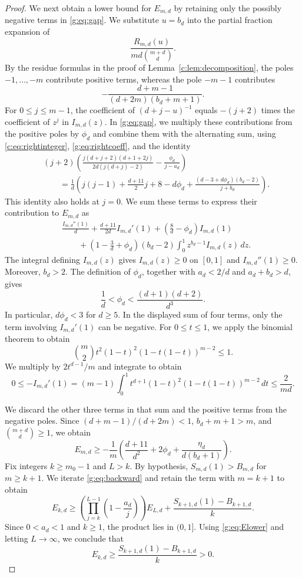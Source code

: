 \documentclass[11pt]{article}
\numberwithin{equation}{section}
\theoremstyle{remark}\newtheorem{remark}[theorem]{Remark}
\begin{document}
\begin{proof}
We next obtain a lower bound for $E_{m,d}$ by retaining only
the possibly negative terms in \eqref{g:eq:gap}.
We substitute $u=b_d$ into the partial fraction expansion of
\[
 \frac{R_{m,d}(u)}{md\binom{m+d}{d}}.
\]
By the residue formulas in the proof of
Lemma~\ref{c:lem:decomposition}, the poles $-1,\ldots,-m$ contribute
positive terms, whereas the pole $-m-1$ contributes
\[
 -\frac{d+m-1}{(d+2m)(b_d+m+1)}.
\]
For $0\le j\le m-1$, the coefficient of $(d+j-u)^{-1}$ equals
$-(j+2)$ times the coefficient of $z^j$ in $I_{m,d}(z)$.
In \eqref{g:eq:gap}, we multiply these contributions from the positive poles by
$\phi_d$ and combine them with the alternating sum, using \eqref{c:eq:rightinteger},
\eqref{g:eq:rightcoeff}, and the identity
\[
\begin{aligned}
 &(j+2)\left(
 \frac{j(d+j+2)(d+1+2j)}{2d(j(d+j)-2)}
 -\frac{\phi_d}{j-a_d}\right)\\
 &\qquad=\frac1d\left(j(j-1)+\frac{d+11}{2}j+8-d\phi_d
 +\frac{(d-3+d\phi_d)(b_d-2)}{j+b_d}\right).
\end{aligned}
\]
This identity also holds at $j=0$. We sum these terms to express their
contribution to $E_{m,d}$ as
\[
\begin{aligned}
 &\frac{I_{m,d}''(1)}d+\frac{d+11}{2d}I_{m,d}'(1)
 +\left(\frac8d-\phi_d\right)I_{m,d}(1)\\
 &\qquad+\left(1-\frac3d+\phi_d\right)(b_d-2)
 \int_0^1z^{b_d-1}I_{m,d}(z)\,dz.
\end{aligned}
\]
The integral defining $I_{m,d}(z)$ gives $I_{m,d}(z)\ge0$ on $[0,1]$
and $I_{m,d}''(1)\ge0$. Moreover, $b_d>2$.
The definition of $\phi_d$, together with $a_d<2/d$ and $a_d+b_d>d$, gives
\begin{equation}\label{v3:eq:phibounds}
 \frac1d<\phi_d<\frac{(d+1)(d+2)}{d^3}.
\end{equation}
In particular, $d\phi_d<3$ for $d\ge5$.
In the displayed sum of four terms, only the term involving
$I_{m,d}'(1)$ can be negative.
For $0\le t\le1$, we apply the binomial theorem to obtain
\[
 \binom m2t^2(1-t)^2(1-t(1-t))^{m-2}\le1.
\]
We multiply by $2t^{d-1}/m$ and integrate to obtain
\[
 0\le-I_{m,d}'(1)
 =(m-1)\int_0^1t^{d+1}(1-t)^2(1-t(1-t))^{m-2}\,dt
 \le\frac2{md}.
\]

We discard the other three terms in that sum and the positive terms
from the negative poles.
Since $(d+m-1)/(d+2m)<1$, $b_d+m+1>m$, and $\binom{m+d}{d}\ge1$,
we obtain
\begin{equation}\label{g:eq:Elower}
 E_{m,d}\ge-\frac1m\left(
 \frac{d+11}{d^2}+2\phi_d+\frac{\eta_d}{d(b_d+1)}\right).
\end{equation}
Fix integers $k\ge m_0-1$ and $L>k$. By hypothesis,
$S_{m,d}(1)>B_{m,d}$ for $m\ge k+1$.
We iterate \eqref{g:eq:backward} and retain the term with $m=k+1$ to obtain
\[
 E_{k,d}\ge\left(\prod_{j=k}^{L-1}\left(1-\frac{a_d}{j}\right)\right)E_{L,d}
 +\frac{S_{k+1,d}(1)-B_{k+1,d}}{k}.
\]
Since $0<a_d<1$ and $k\ge1$, the product lies in $(0,1]$.
Using \eqref{g:eq:Elower} and letting $L\to\infty$, we conclude that
\[
 E_{k,d}\ge\frac{S_{k+1,d}(1)-B_{k+1,d}}{k}>0.
\]
\end{proof}
\end{document}
